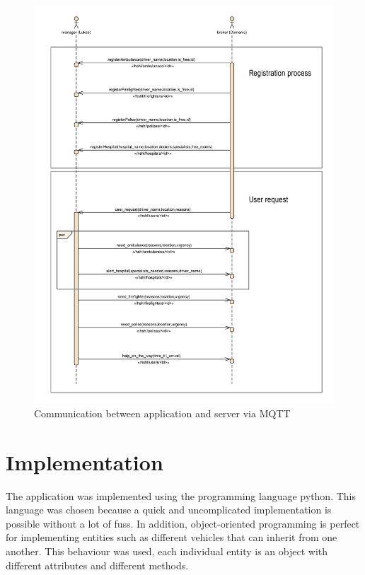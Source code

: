 \begin{figure}
\sidecaption
\includegraphics[scale=0.6]{images/walter/sequence_png.png}
\caption{Communication between application and server via MQTT}
\label{SEQ}
\end{figure}



\section{Implementation}
\label{sec:4}

The application was implemented using the programming language python. This language was chosen because a quick and uncomplicated implementation is possible without a lot of fuss. In addition, object-oriented programming is perfect for implementing entities such as different vehicles that can inherit from one another. This behaviour was used, each individual entity is an object with different attributes and different methods. 

